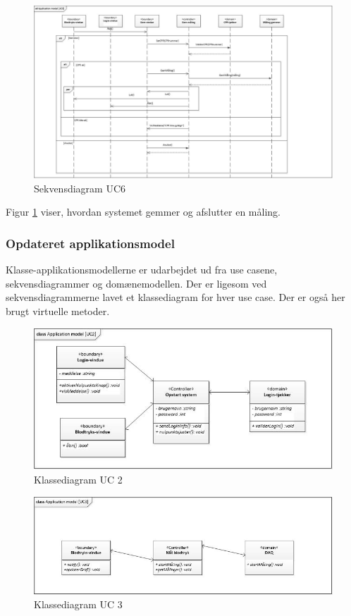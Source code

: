 \begin{figure}[H]
	\includegraphics[width=1\textwidth]{Figurer/ISE/sdAppModelUC6}
	\caption{Sekvensdiagram UC6}
	\label{sd UC6}
\end{figure}

Figur \ref{sd UC6} viser, hvordan systemet gemmer og afslutter en måling. 

\subsubsection{Opdateret applikationsmodel}
Klasse-applikationsmodellerne er udarbejdet ud fra use casene, sekvensdiagrammer og domænemodellen. Der er ligesom ved sekvensdiagrammerne lavet et klassediagram for hver use case. Der er også her brugt virtuelle metoder. 

\begin{figure}[H]
	\centering
	\includegraphics[width=1\textwidth]{Figurer/ISE/classAppModelUC2}
	\caption{Klassediagram UC 2}
	\label{classApp UC2}
\end{figure}

\begin{figure}[H]
	\centering
	\includegraphics[width=1\textwidth]{Figurer/ISE/classAppModelUC3}
	\caption{Klassediagram UC 3}
	\label{classApp UC3}
\end{figure}

